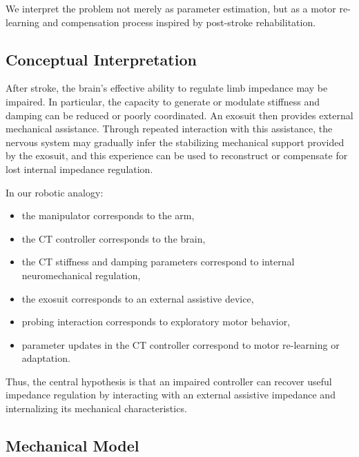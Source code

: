 \documentclass[11pt]{article}
\begin{document}
We interpret the problem not merely as parameter estimation, but as a motor re-learning and compensation process inspired by post-stroke rehabilitation.

\subsection{Conceptual Interpretation}

After stroke, the brain's effective ability to regulate limb impedance may be impaired. In particular, the capacity to generate or modulate stiffness and damping can be reduced or poorly coordinated. An exosuit then provides external mechanical assistance. Through repeated interaction with this assistance, the nervous system may gradually infer the stabilizing mechanical support provided by the exosuit, and this experience can be used to reconstruct or compensate for lost internal impedance regulation.

In our robotic analogy:
\begin{itemize}
    \item the manipulator corresponds to the arm,
    \item the CT controller corresponds to the brain,
    \item the CT stiffness and damping parameters correspond to internal neuromechanical regulation,
    \item the exosuit corresponds to an external assistive device,
    \item probing interaction corresponds to exploratory motor behavior,
    \item parameter updates in the CT controller correspond to motor re-learning or adaptation.
\end{itemize}

Thus, the central hypothesis is that an impaired controller can recover useful impedance regulation by interacting with an external assistive impedance and internalizing its mechanical characteristics.

\subsection{Mechanical Model}
\end{document}

